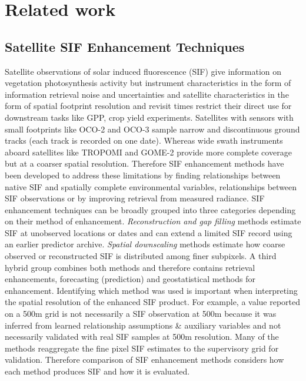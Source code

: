 \chapter{Related work\label{cha:chapter3}}

\section{Satellite SIF Enhancement Techniques}
\label{sec:sif_enhancement}

Satellite observations of solar induced fluorescence (SIF) give information on vegetation photosynthesis activity but instrument characteristics in the form of information retrieval noise and uncertainties and satellite characteristics in the form of spatial footprint resolution and revisit times restrict their direct use for downstream tasks like GPP, crop yield experiments. Satellites with sensors with small footprints like OCO-2 and OCO-3 sample narrow and discontinuous ground tracks (each track is recorded on one date). Whereas wide swath instruments aboard satellites like TROPOMI \cite{kohler2018global} and GOME-2 \cite{anema2026long} provide more complete coverage but at a coarser spatial resolution. Therefore SIF enhancement methods have been developed to address these limitations by finding relationships between native SIF and spatially complete environmental variables, relationships between SIF observations or by improving retrieval from measured radiance. SIF enhancement techniques can be broadly grouped into three categories depending on their method of enhancement. \emph{Reconstruction and gap filling} methods estimate SIF at unobserved locations or dates and can extend a limited SIF record using an earlier predictor archive. \emph{Spatial downscaling} methods estimate how coarse observed or reconstructed SIF is distributed among finer subpixels. A third hybrid group combines both methods and therefore contains retrieval enhancements, forecasting (prediction) and geostatistical methods for enhancement. Identifying which method was used is important when interpreting the spatial resolution of the enhanced SIF product. For example, a value reported on a 500m grid is not necessarily a SIF observation at 500m because it was inferred from learned relationship assumptions \& auxiliary variables and not necessarily validated with real SIF samples at 500m resolution. Many of the methods reaggregate the fine pixel SIF estimates to the supervisory grid for validation. Therefore comparison of SIF enhancement methods considers how each method produces SIF and how it is evaluated.

